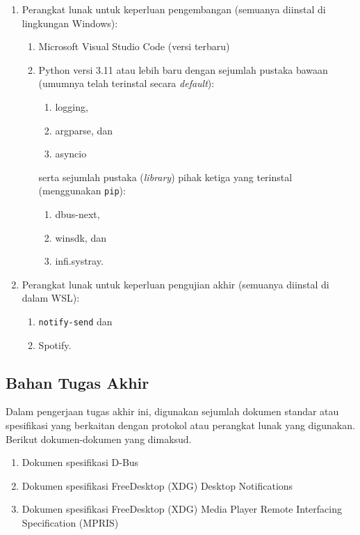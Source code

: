 \begin{enumerate}
    \item Perangkat lunak untuk keperluan pengembangan (semuanya diinstal di lingkungan Windows):
    \begin{enumerate}
        \item Microsoft Visual Studio Code (versi terbaru)
        \item Python versi 3.11 atau lebih baru dengan sejumlah pustaka bawaan (umumnya telah terinstal secara \textit{default}):
        \begin{enumerate}
            \item logging,
            \item argparse, dan
            \item asyncio
        \end{enumerate}
        serta sejumlah pustaka (\textit{library}) pihak ketiga yang terinstal (menggunakan \verb|pip|):
        \begin{enumerate}
            \item dbus-next,
            \item winsdk, dan
            \item infi.systray.
        \end{enumerate}
    \end{enumerate}
    
    \item Perangkat lunak untuk keperluan pengujian akhir (semuanya diinstal di dalam WSL):
    \begin{enumerate}
        \item \verb|notify-send| dan
        \item Spotify.
    \end{enumerate}
\end{enumerate}

\subsection{Bahan Tugas Akhir}

Dalam pengerjaan tugas akhir ini, digunakan sejumlah dokumen standar atau spesifikasi yang berkaitan dengan protokol atau perangkat lunak yang digunakan. Berikut dokumen-dokumen yang dimaksud.
\begin{enumerate}
    \item Dokumen spesifikasi D-Bus \cite{dbus-specification}
    \item Dokumen spesifikasi FreeDesktop (XDG) Desktop Notifications \cite{xdg-desktop-notifications-specification}
    \item Dokumen spesifikasi FreeDesktop (XDG) Media Player Remote Interfacing Specification (MPRIS) \cite{xdg-mpris-specification}
\end{enumerate}


